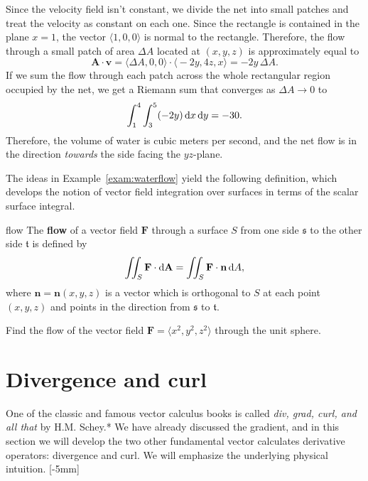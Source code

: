 \documentclass{watsonbook}
\begin{document}
\begin{solution}
  Since the velocity field isn't constant, we divide the net into
  small patches and treat the velocity as constant on each one. Since
  the rectangle is contained in the plane $x=1$, the vector
  $\langle 1, 0, 0 \rangle$ is normal to the rectangle. Therefore, the flow
  through a small patch of area $\Delta A$ located at $(x,y,z)$ is
  approximately equal to
  \[
    \mathbf{A} \cdot \mathbf{v} = \big\langle \Delta A, 0, 0 \big\rangle \cdot
    \big\langle -2y, 4z, x \big\rangle = -2y \, \Delta A. 
  \]
  If we sum the flow through each patch across the whole rectangular
  region occupied by the net, we get a Riemann sum that converges as
  $\Delta A \to 0$ to
  \[
    \int_1^4 \int_3^5 (-2y) \, \mathrm{d} x \, \mathrm{d} y = -30. 
  \]
  Therefore, the volume of water is  cubic meters per second, and the
  net flow is in the direction \textit{towards} the side facing the $yz$-plane. 
\end{solution}

The ideas in Example~\ref{exam:waterflow} yield the following
definition, which develops the notion of vector field integration over
surfaces in terms of the scalar surface
integral. 

\begin{defn}{}{flow}
  The \textbf{flow} of a vector field $\mathbf{F}$ through a surface
  $S$ from one side $\mathfrak{s}$ to the other side $\mathfrak{t}$ is defined by
  \[
    \iint_S \mathbf{F} \cdot \mathrm{d}\mathbf{A} =  \iint_S \mathbf{F} \cdot \mathbf{n}
    \, {\mathrm{d}}A, 
  \]
  where $\mathbf{n}=\mathbf{n}(x,y,z)$ is a vector which is
  orthogonal to $S$ at each point $(x,y,z)$ and points in the
  direction from $\mathfrak{s}$ to $\mathfrak{t}$. 
\end{defn}

\begin{exercise}{}{}
  Find the flow of the vector field $\mathbf{F} = \langle x^2, y^2, z^2 \rangle$
  through the unit sphere. 
\end{exercise}

\section{Divergence and curl} \label{sec:divcurl} 

One of the classic and famous vector calculus books is called \textit{div,
  grad, curl, and all that} by H.M. Schey.* We have already discussed the gradient,
and in this section we will develop the two other fundamental vector
calculates derivative operators: divergence and curl. We will
emphasize the underlying physical intuition. [-5mm]
\end{document}
